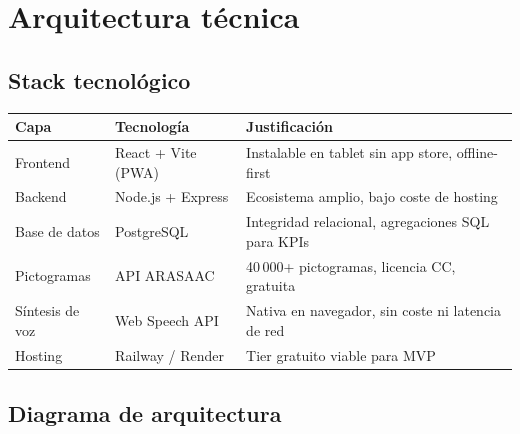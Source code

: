 \documentclass[12pt, a4paper]{article}
\begin{document}
\section{Arquitectura técnica}

\subsection{Stack tecnológico}

\begin{tabular}{L{3.5cm} L{4cm} L{6.5cm}}
\toprule
\textbf{Capa} & \textbf{Tecnología} & \textbf{Justificación} \\
\midrule
Frontend & React + Vite (PWA) & Instalable en tablet sin app store, offline-first \\
Backend & Node.js + Express & Ecosistema amplio, bajo coste de hosting \\
Base de datos & PostgreSQL & Integridad relacional, agregaciones SQL para KPIs \\
Pictogramas & API ARASAAC & 40\,000+ pictogramas, licencia CC, gratuita \\
Síntesis de voz & Web Speech API & Nativa en navegador, sin coste ni latencia de red \\
Hosting & Railway / Render & Tier gratuito viable para MVP \\
\bottomrule
\end{tabular}

\subsection{Diagrama de arquitectura}
\end{document}
